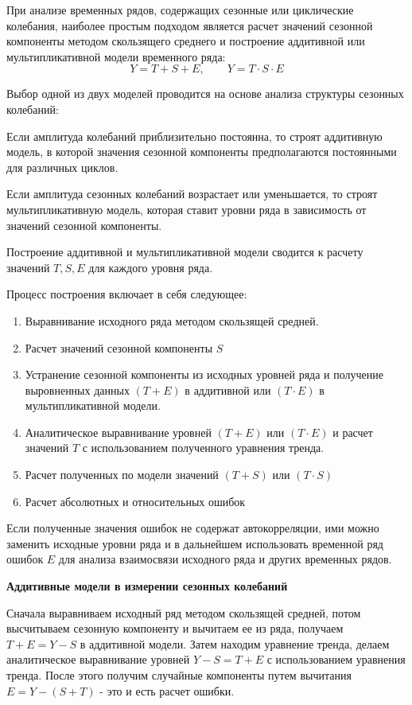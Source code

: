 \documentclass[aps,%
12pt,%
final,%
oneside,
onecolumn,%
musixtex, %
superscriptaddress,%
centertags]{article} %
\theoremstyle{plain}
\theoremstyle{definition}
\theoremstyle{remark}
\begin{document}
При анализе временных рядов, содержащих сезонные или циклические колебания, наиболее простым подходом является расчет значений сезонной компоненты методом скользящего среднего и построение аддитивной или мультипликативной модели временного ряда:
$$Y  = T + S + E, \qquad  Y = T \cdot S \cdot E$$

Выбор одной из двух моделей проводится на основе анализа структуры сезонных колебаний:

Если амплитуда колебаний приблизительно постоянна, то строят аддитивную модель, в которой значения сезонной компоненты предполагаются постоянными для различных циклов.

Если амплитуда сезонных колебаний возрастает или уменьшается, то строят мультипликативную модель, которая ставит уровни ряда в зависимость от значений сезонной компоненты.

Построение аддитивной и мультипликативной модели сводится к расчету значений $T, S, E$ для каждого уровня ряда.

Процесс построения включает в себя следующее:

\begin{enumerate}
	\item Выравнивание исходного ряда методом скользящей средней.
	\item Расчет значений сезонной компоненты $S$
	\item Устранение сезонной компоненты из исходных уровней ряда и получение выровненных данных $(T+E)$ в аддитивной или $(T \cdot E)$ в мультипликативной модели.
	\item Аналитическое выравнивание уровней $(T+E)$ или $(T \cdot E)$ и расчет значений $T$ с использованием полученного уравнения тренда.
	\item Расчет полученных по модели значений $(T+S)$ или $(T \cdot S)$
	\item Расчет абсолютных и относительных ошибок
\end{enumerate}

Если полученные значения ошибок не содержат автокорреляции, ими можно заменить исходные уровни ряда и в дальнейшем использовать временной ряд ошибок $E$ для анализа взаимосвязи исходного ряда и других временных рядов.

\textbf{Аддитивные модели в измерении сезонных колебаний}

Сначала выравниваем исходный ряд методом скользящей средней, потом высчитываем сезонную компоненту и вычитаем ее из ряда, получаем $T+E = Y-S$ в аддитивной модели. Затем находим уравнение тренда, делаем аналитическое выравнивание уровней $Y-S = T+E$ с использованием уравнения тренда. После этого получим случайные компоненты путем вычитания $E = Y - (S+T)$ - это и есть расчет ошибки.
\end{document}
